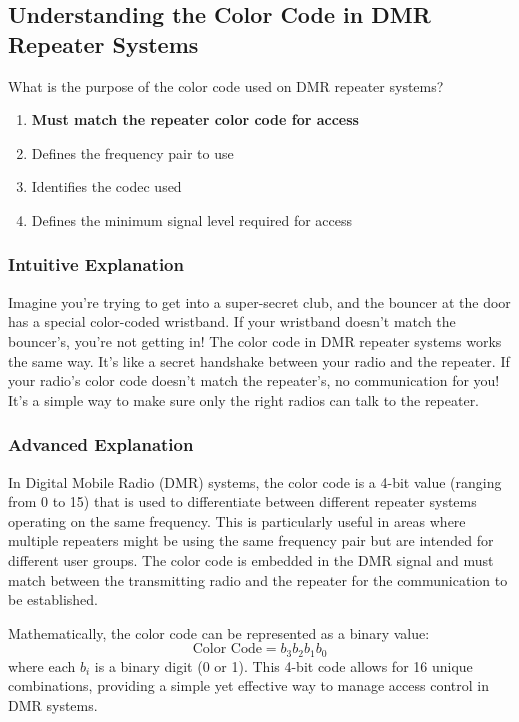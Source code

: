 \subsection{Understanding the Color Code in DMR Repeater Systems}
\label{T2B12}

\begin{tcolorbox}[colback=gray!10!white,colframe=black!75!black,title=T2B12]
What is the purpose of the color code used on DMR repeater systems?
\begin{enumerate}[label=\Alph*)]
    \item \textbf{Must match the repeater color code for access}
    \item Defines the frequency pair to use
    \item Identifies the codec used
    \item Defines the minimum signal level required for access
\end{enumerate}
\end{tcolorbox}

\subsubsection{Intuitive Explanation}
Imagine you’re trying to get into a super-secret club, and the bouncer at the door has a special color-coded wristband. If your wristband doesn’t match the bouncer’s, you’re not getting in! The color code in DMR repeater systems works the same way. It’s like a secret handshake between your radio and the repeater. If your radio’s color code doesn’t match the repeater’s, no communication for you! It’s a simple way to make sure only the right radios can talk to the repeater.

\subsubsection{Advanced Explanation}
In Digital Mobile Radio (DMR) systems, the color code is a 4-bit value (ranging from 0 to 15) that is used to differentiate between different repeater systems operating on the same frequency. This is particularly useful in areas where multiple repeaters might be using the same frequency pair but are intended for different user groups. The color code is embedded in the DMR signal and must match between the transmitting radio and the repeater for the communication to be established.

Mathematically, the color code can be represented as a binary value:
\[
\text{Color Code} = b_3b_2b_1b_0
\]
where each \( b_i \) is a binary digit (0 or 1). This 4-bit code allows for 16 unique combinations, providing a simple yet effective way to manage access control in DMR systems.

